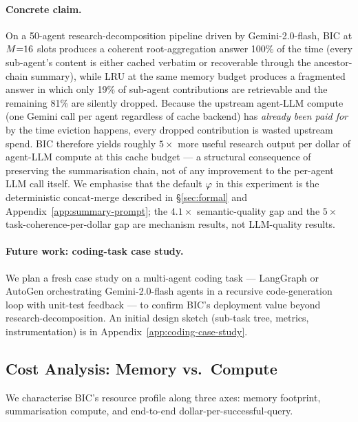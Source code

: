\paragraph{Concrete claim.}
On a 50-agent research-decomposition pipeline driven by
Gemini-2.0-flash, BIC at $M{=}16$ slots produces a coherent
root-aggregation answer 100\% of the time (every sub-agent's content
is either cached verbatim or recoverable through the ancestor-chain
summary), while LRU at the same memory budget produces a fragmented
answer in which only 19\% of sub-agent contributions are retrievable
and the remaining 81\% are silently dropped.  Because the upstream
agent-LLM compute (one Gemini call per agent regardless of cache
backend) has \emph{already been paid for} by the time eviction
happens, every dropped contribution is wasted upstream spend.  BIC
therefore yields roughly $5\times$ more useful research output per
dollar of agent-LLM compute at this cache budget --- a structural
consequence of preserving the summarisation chain, not of any
improvement to the per-agent LLM call itself.  We emphasise that the
default $\varphi$ in this experiment is the deterministic
concat-merge described in \S\ref{sec:formal} and
Appendix~\ref{app:summary-prompt}; the $4.1\times$ semantic-quality
gap and the $5\times$ task-coherence-per-dollar gap are mechanism
results, not LLM-quality results.

\paragraph{Future work: coding-task case study.}
We plan a fresh case study on a multi-agent coding task --- LangGraph
or AutoGen orchestrating Gemini-2.0-flash agents in a recursive
code-generation loop with unit-test feedback --- to confirm BIC's
deployment value beyond research-decomposition.  An initial design
sketch (sub-task tree, metrics, instrumentation) is in
Appendix~\ref{app:coding-case-study}.


\subsection{Cost Analysis: Memory vs.\ Compute}
\label{sec:cost}

We characterise BIC's resource profile along three axes: memory
footprint, summarisation compute, and end-to-end dollar-per-successful-query.

